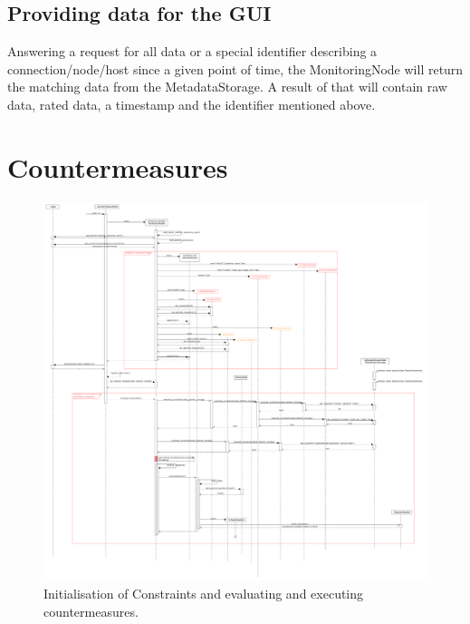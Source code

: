\subsection*{Providing data for the GUI}
Answering a request for all data or a special identifier describing a connection/node/host since a given point of time, the MonitoringNode will return the matching data from the MetadataStorage.
A result of that will contain raw data, rated data, a timestamp and the identifier mentioned above.
 
\newpage 
\section{Countermeasures} 
\begin{figure}[!ht] 
	\begin{center} 
		\includegraphics[width=1.0\linewidth]{./diagram_pictures/reactor/reactor_seq.pdf} 
		\caption{Initialisation of Constraints and evaluating and executing countermeasures.} 
	\end{center} 
\end{figure}

